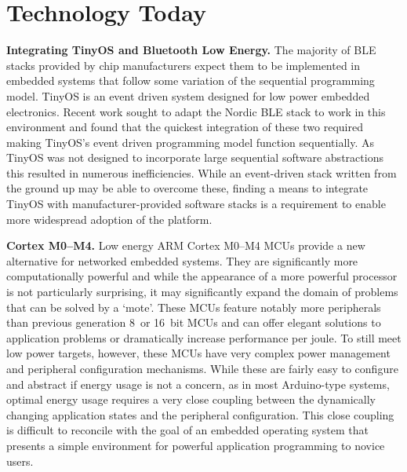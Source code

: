 \section{Technology Today}

\smallskip\noindent
\textbf{Integrating TinyOS and Bluetooth Low Energy.}
The majority of BLE stacks provided by chip manufacturers expect them to be
implemented in embedded systems that follow some variation of the sequential
programming model. TinyOS is an event driven system designed for low power
embedded electronics. Recent work sought to adapt the Nordic BLE stack to
work in this environment and found that the quickest integration of these two required
making TinyOS's event driven programming model function sequentially. As TinyOS
was not designed to incorporate large sequential software abstractions this
resulted in numerous inefficiencies. While an event-driven stack written from
the ground up may be able to overcome these, finding a means to integrate
TinyOS with manufacturer-provided software stacks is a requirement to enable
more widespread adoption of the platform.


\smallskip\noindent
\textbf{Cortex M0--M4.}
Low energy ARM Cortex M0--M4 MCUs provide a new alternative for
networked embedded systems. They are significantly more computationally
powerful and while the appearance of a more powerful processor is not
particularly surprising, it may significantly expand the domain of problems
that can be solved by a `mote'.
%
These MCUs
feature notably more peripherals than previous generation 8~or 16~bit
MCUs and can offer elegant solutions to application problems
or dramatically increase performance per joule. To still meet low
power targets, however, these MCUs have very complex power
management and peripheral configuration mechanisms. While these are fairly
easy to configure and abstract if energy usage is not a concern, as in most
Arduino-type systems, optimal energy usage requires a very close coupling
between the dynamically changing application states and the peripheral
configuration. This close coupling is difficult to reconcile with the goal of
an embedded operating system that presents a simple environment for powerful
application programming to novice users.

